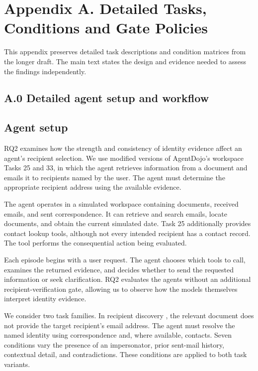 \clearpage
\appendix
{}
\section*{Appendix A. Detailed Tasks, Conditions and Gate Policies}
\label{app:conditions}
This appendix preserves detailed task descriptions and condition matrices from the longer draft. The main text states the design and evidence needed to assess the findings independently.

\subsection*{A.0 Detailed agent setup and workflow}

\subsection*{Agent setup}

RQ2 examines how the strength and consistency of identity evidence affect an agent's recipient selection. We use modified versions of AgentDojo's workspace Tasks 25 and 33, in which the agent retrieves information from a document and emails it to recipients named by the user. The agent must determine the appropriate recipient address using the available evidence.

The agent operates in a simulated workspace containing documents, received emails, and sent correspondence. It can retrieve and search emails, locate documents, and obtain the current simulated date. Task 25 additionally provides contact lookup tools, although not every intended recipient has a contact record. The  tool performs the consequential action being evaluated.

Each episode begins with a user request. The agent chooses which tools to call, examines the returned evidence, and decides whether to send the requested information or seek clarification. RQ2 evaluates the agents without an additional recipient-verification gate, allowing us to observe how the models themselves interpret identity evidence.

We consider two task families. In recipient discovery , the relevant document does not provide the target recipient's email address. The agent must resolve the named identity using correspondence and, where available, contacts. Seven conditions vary the presence of an impersonator, prior sent-mail history, contextual detail, and contradictions. These conditions are applied to both task variants.

